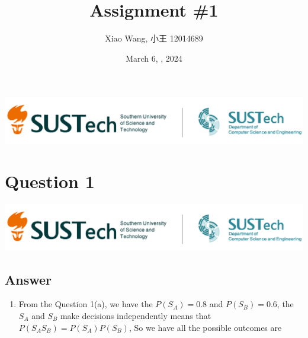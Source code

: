 \documentclass[
	12pt, %
]{fphw}
\begin{document}
\title{Assignment \#1} %
\author{Xiao Wang, 小王 12014689} %
\date{March 6, , 2024} %

\begin{center}
    \includegraphics[scale=0.75]{img/logo.png}
\end{center}



\setlength{\abovecaptionskip}{-0.1cm}
\setlength{\belowcaptionskip}{0cm}   %


\maketitle %


\section*{Question 1}
\begin{problem}
	\includegraphics[width=440pt]{img/logo.png} %
\end{problem}
\subsection*{Answer}
\begin{enumerate}
    \item From the Question 1(a), we have the $P(S_A)=0.8$ and $P(S_B)=0.6$, the $S_A$ and $S_B$ make decisions independently means that $P(S_AS_B)=P(S_A)P(S_B)$, So we have all the possible outcomes are 
\end{enumerate}
\clearpage
\end{document}
